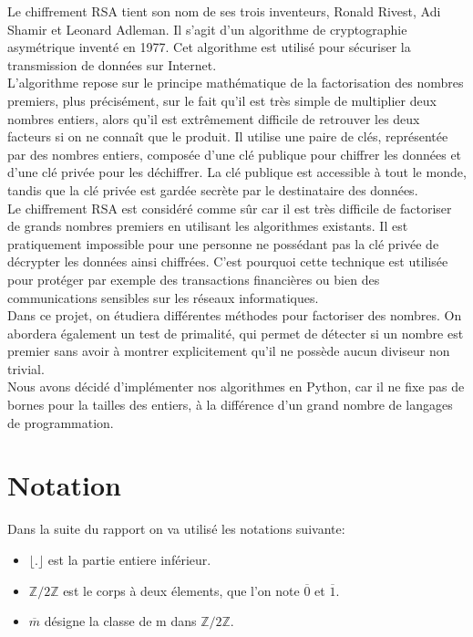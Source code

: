 Le chiffrement RSA tient son nom de ses trois inventeurs, Ronald Rivest, Adi Shamir et Leonard Adleman.
Il s'agit d'un algorithme de cryptographie asymétrique inventé en 1977. Cet algorithme est utilisé pour sécuriser la transmission de données sur Internet. \\

L'algorithme repose sur le principe mathématique de la factorisation des nombres premiers, plus précisément, sur le fait qu’il est très simple de multiplier deux nombres entiers, alors qu’il est extrêmement difficile de retrouver les deux facteurs si on ne connaît que le produit. Il utilise une paire de clés, représentée par des nombres entiers, composée d'une clé publique pour chiffrer les données et d'une clé privée pour les déchiffrer. La clé publique est accessible à tout le monde, tandis que la clé privée est gardée secrète par le destinataire des données.\\

Le chiffrement RSA est considéré comme sûr car il est très difficile de factoriser de grands nombres premiers en utilisant les algorithmes existants. Il est pratiquement impossible pour une personne ne possédant pas la clé privée de décrypter les données ainsi chiffrées. C'est pourquoi cette technique est utilisée pour protéger par exemple des transactions financières ou bien des communications sensibles sur les réseaux informatiques. \\

Dans ce projet, on étudiera différentes méthodes pour factoriser des nombres. On abordera également un test de primalité, qui permet de détecter si un nombre est premier sans avoir à montrer explicitement qu’il ne possède aucun diviseur non trivial.\\

Nous avons décidé d'implémenter nos algorithmes en Python, car il ne fixe pas de bornes pour la tailles des entiers, à la différence d'un grand nombre de langages de programmation.

\section*{Notation}
    Dans la suite du rapport on va utilisé les notations suivante:
    \begin{itemize}
        \item $\lfloor . \rfloor$ est la  partie entiere inférieur.
        \item $\mathbb{Z}/2\mathbb{Z}$ est le corps à deux élements, que l'on note $\overline{0}$ et $\overline{1}$.
        \item $\overline{m}$ désigne la classe de m dans $\mathbb{Z}/2\mathbb{Z}$.
    \end{itemize}